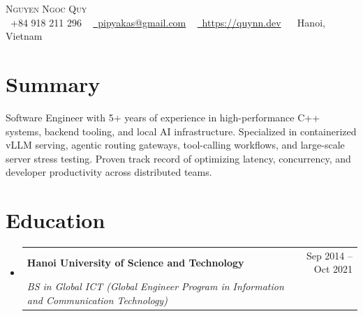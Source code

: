 \documentclass[letterpaper,10pt]{article}
\makeatletter
\newcommand{\resumeSubheading}[4]{
  \vspace{1pt}\item
    \begin{tabular*}{0.97\textwidth}[t]{l@{\extracolsep{\fill}}r}
      \textbf{#1} & #2 \\
      \textit{\small#3} & \textit{\small #4} \\
    \end{tabular*}\vspace{-2pt}
}
\newcommand{\resumeSubHeadingListStart}{\begin{itemize}[leftmargin=0.15in, label={}, itemsep=2pt]}
\newcommand{\resumeSubHeadingListEnd}{\end{itemize}\vspace{2pt}}
\makeatother
\begin{document}
\begin{center}
    {\Huge \scshape Nguyen Ngoc Quy} \\ \vspace{1pt}
    \small
    \raisebox{-0.1\height}\faPhone\ +84 918 211 296 ~
    \href{mailto:pipyakas@gmail.com}{\raisebox{-0.2\height}\faEnvelope\ pipyakas@gmail.com} ~
    \href{https://quynn.dev}{\raisebox{-0.2\height}\faLink\ https://quynn.dev} ~
    \raisebox{-0.1\height}\faMapMarker\ Hanoi, Vietnam
\end{center}

\section{Summary}
Software Engineer with 5+ years of experience in high-performance C++ systems, backend tooling, and local AI infrastructure. Specialized in containerized vLLM serving, agentic routing gateways, tool-calling workflows, and large-scale server stress testing. Proven track record of optimizing latency, concurrency, and developer productivity across distributed teams.

\section{Education}
  \resumeSubHeadingListStart
    \resumeSubheading
      {Hanoi University of Science and Technology}{Sep 2014 -- Oct 2021}
      {BS in Global ICT (Global Engineer Program in Information and Communication Technology)}{}
  \resumeSubHeadingListEnd

\end{document}

